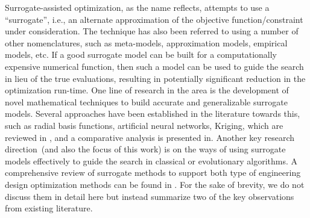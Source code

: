 Surrogate-assisted optimization, as the name reflects, attempts to use a ``surrogate'', i.e., an alternate approximation of the objective function/constraint under consideration. The technique has also been referred to using a number of other nomenclatures, such as meta-models, approximation models, empirical models, etc. If a good surrogate model can be built for a computationally expensive numerical function, then such a model can be used to guide the search in lieu of the true evaluations, resulting in potentially significant reduction in the optimization run-time. {\color{blue} One line of research in the area is the development of novel mathematical techniques to build accurate and generalizable surrogate models. Several approaches have been established in the literature towards this, such as radial basis functions, artificial neural networks, Kriging, which are reviewed in \cite{KHTjin2005csf,KHTjinswarm2011}, and a comparative analysis is presented in\cite{jin2001comparative}. Another key research direction~(and also the focus of this work) is on the ways of using surrogate models effectively to guide the search in classical or evolutionary algorithms. A comprehensive review of surrogate methods to support both type of engineering design optimization methods can be found in \cite{KHTwangreview2007}}. For the sake of brevity, we do not discuss them in detail here but instead summarize two of the key observations from existing literature. 
\vspace{-0.3em}
